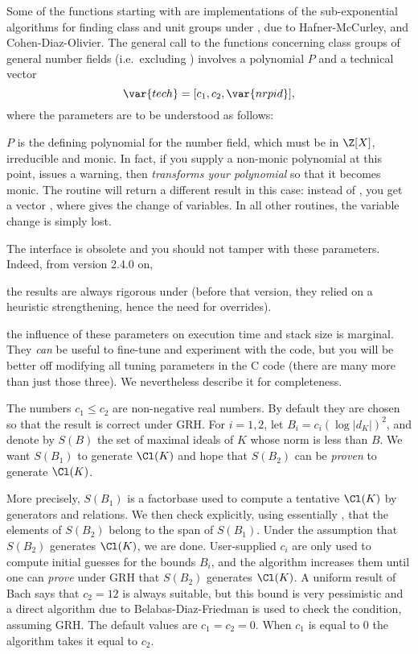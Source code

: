 \label{se:GRHbnf}

Some of the functions starting with  are implementations of the
sub-exponential algorithms for finding class and unit groups under ,
due to Hafner-McCurley,  and Cohen-Diaz-Olivier. The general
call to the functions concerning class groups of general number fields
(i.e.~excluding ) involves a polynomial $P$ and a
technical vector
$$\var{tech} = [c_1, c_2, \var{nrpid} ],$$
where the parameters are to be understood as follows:

$P$ is the defining polynomial for the number field, which must be in
$\Z[X]$, irreducible and monic. In fact, if you supply a non-monic polynomial
at this point,  issues a warning, then \emph{transforms your
polynomial} so that it becomes monic. The  routine
will return a different result in this case: instead of , you get a
vector , where  gives the change
of variables. In all other routines, the variable change is simply lost.

The  interface is obsolete and you should not tamper with
these parameters. Indeed, from version 2.4.0 on,

\item the results are always rigorous under  (before that version,
they relied on a heuristic strengthening, hence the need for overrides).

\item the influence of these parameters on execution time and stack size is
marginal. They \emph{can} be useful to fine-tune and experiment with the
 code, but you will be better off modifying all tuning
parameters in the C code (there are many more than just those three).
We nevertheless describe it for completeness.

The numbers $c_1 \leq c_2$ are non-negative real numbers. By default they are
chosen so that the result is correct under GRH. For $i = 1,2$, let
$B_i = c_i(\log |d_K|)^2$, and denote by $S(B)$ the set of maximal ideals of
$K$ whose norm is less than $B$. We want $S(B_1)$ to generate $\Cl(K)$ and hope
that $S(B_2)$ can be \emph{proven} to generate $\Cl(K)$.

More precisely, $S(B_1)$ is a factorbase used to compute a tentative
$\Cl(K)$ by generators and relations. We then check explicitly, using
essentially , that the elements of $S(B_2)$ belong to the
span of $S(B_1)$. Under the assumption that $S(B_2)$ generates $\Cl(K)$, we
are done. User-supplied $c_i$ are only used to compute initial guesses for
the bounds $B_i$, and the algorithm increases them until one can \emph{prove}
under GRH that $S(B_2)$ generates $\Cl(K)$. A uniform result of Bach says
that $c_2 = 12$ is always suitable, but this bound is very pessimistic and a
direct algorithm due to Belabas-Diaz-Friedman is used to check the condition,
assuming GRH. The default values are $c_1 = c_2 = 0$. When $c_1$ is equal to
$0$ the algorithm takes it equal to $c_2$.

